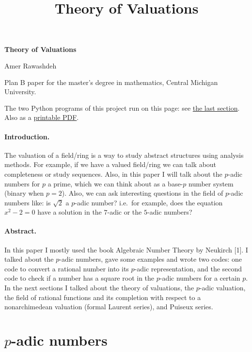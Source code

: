 \documentclass[11pt]{article}
\title{Theory of Valuations}
\begin{document}
\begin{pdfonly}
\begin{center}
{\LARGE\bfseries Theory of Valuations\par}\medskip
{\large Amer Rawashdeh\par}
\end{center}
\end{pdfonly}

\begin{byline}
Plan B paper for the master's degree in mathematics, Central Michigan University.
\end{byline}

\begin{webonly}
The two Python programs of this project run on this page: see \href{\#programs}{the last section}.
Also as a \href{../../latex/projects/valuations.pdf}{printable PDF}.
\end{webonly}

\paragraph{Introduction.}
The valuation of a field/ring is a way to study abstract structures using analysis methods. For example, if we have a valued field/ring we can talk about completeness or study sequences. Also, in this paper I will talk about the $p$-adic numbers for $p$ a prime, which we can think about as a base-$p$ number system (binary when $p=2$). Also, we can ask interesting questions in the field of $p$-adic numbers like: is $\sqrt{2}$ a $p$-adic number? i.e.\ for example, does the equation $x^2-2=0$ have a solution in the $7$-adic or the $5$-adic numbers?

\paragraph{Abstract.}
In this paper I mostly used the book Algebraic Number Theory by Neukirch [1]. I talked about the $p$-adic numbers, gave some examples and wrote two codes: one code to convert a rational number into its $p$-adic representation, and the second code to check if a number has a square root in the $p$-adic numbers for a certain $p$. In the next sections I talked about the theory of valuations, the $p$-adic valuation, the field of rational functions and its completion with respect to a nonarchimedean valuation (formal Laurent series), and Puiseux series.

\section{$p$-adic numbers}
\end{document}
